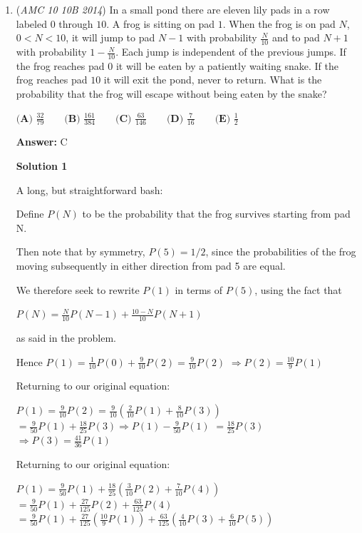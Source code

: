 \begin{enumerate}
 


	\item (\textit{AMC 10 10B 2014}) In a small pond there are eleven lily pads in a row labeled $0$ through $10$. A frog is sitting on pad $1$. When the frog is on pad $N$, $0<N<10$, it will jump to pad $N-1$ with probability $\frac{N}{10}$ and to pad $N+1$ with probability $1-\frac{N}{10}$. Each jump is independent of the previous jumps. If the frog reaches pad $0$ it will be eaten by a patiently waiting snake. If the frog reaches pad $10$ it will exit the pond, never to return. What is the probability that the frog will escape without being eaten by the snake?


 $\textbf {(A) } \frac{32}{79} \qquad \textbf {(B) } \frac{161}{384} \qquad \textbf {(C) } \frac{63}{146} \qquad \textbf {(D) } \frac{7}{16} \qquad \textbf {(E) } \frac{1}{2}$

 \textbf{Answer: }C



\textbf{Solution 1}

A long, but straightforward bash:

 Define $P(N)$ to be the probability that the frog survives starting from pad N.

 Then note that by symmetry, $P(5) = 1/2$, since the probabilities of the frog moving subsequently in either direction from pad 5 are equal.

 We therefore seek to rewrite $P(1)$ in terms of $P(5)$, using the fact that

 $P(N) = \frac {N} {10}P(N - 1) + \frac {10 - N} {10}P(N + 1)$

 as said in the problem.

 Hence $P(1) = \frac {1} {10}P(0) + \frac {9} {10}P(2) = \frac {9} {10}P(2)$
$\Rightarrow P(2) = \frac {10} {9}P(1)$

 Returning to our original equation:

 $P(1) = \frac {9} {10}P(2) = \frac {9} {10}\left(\frac{2} {10}P(1) + \frac{8} {10}P(3)\right)$
$= \frac {9} {50}P(1) + \frac {18} {25}P(3) \Rightarrow P(1) - \frac {9} {50}P(1)$ $= \frac {18} {25}P(3)$
$\Rightarrow P(3) = \frac {41} {36}P(1)$

 Returning to our original equation:

 $P(1) = \frac {9} {50}P(1) + \frac {18} {25}\left(\frac {3} {10}P(2) + \frac {7} {10}P(4)\right)$
$= \frac {9} {50}P(1) + \frac {27} {125}P(2) + \frac {63} {125}P(4)$
$= \frac {9} {50}P(1) + \frac {27} {125}\left(\frac {10} {9}P(1)\right) + \frac {63} {125}\left(\frac {4} {10}P(3) + \frac {6} {10}P(5)\right)$


\end{enumerate}
